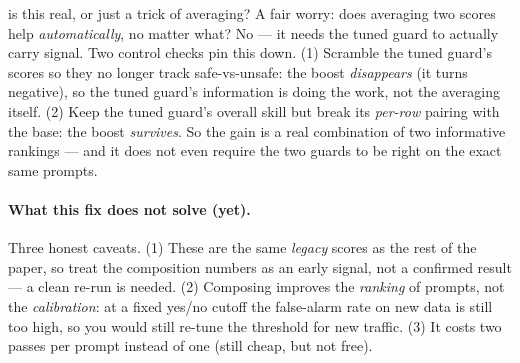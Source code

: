 \documentclass[11pt]{article}
\begin{document}
\begin{background}{is this real, or just a trick of averaging?}
\small
A fair worry: does averaging two scores help \emph{automatically}, no matter what? No --- it
needs the tuned guard to actually carry signal. Two control checks pin this down. (1) Scramble
the tuned guard's scores so they no longer track safe-vs-unsafe: the boost \emph{disappears} (it
turns negative), so the tuned guard's information is doing the work, not the averaging itself.
(2) Keep the tuned guard's overall skill but break its \emph{per-row} pairing with the base: the
boost \emph{survives}. So the gain is a real combination of two informative rankings --- and it
does not even require the two guards to be right on the exact same prompts.
\end{background}

\paragraph{What this fix does not solve (yet).} Three honest caveats. (1) These are the same
\emph{legacy} scores as the rest of the paper, so treat the composition numbers as an early
signal, not a confirmed result --- a clean re-run is needed. (2) Composing improves the
\emph{ranking} of prompts, not the \emph{calibration}: at a fixed yes/no cutoff the false-alarm
rate on new data is still too high, so you would still re-tune the threshold for new traffic.
(3) It costs two passes per prompt instead of one (still cheap, but not free).

\end{document}
